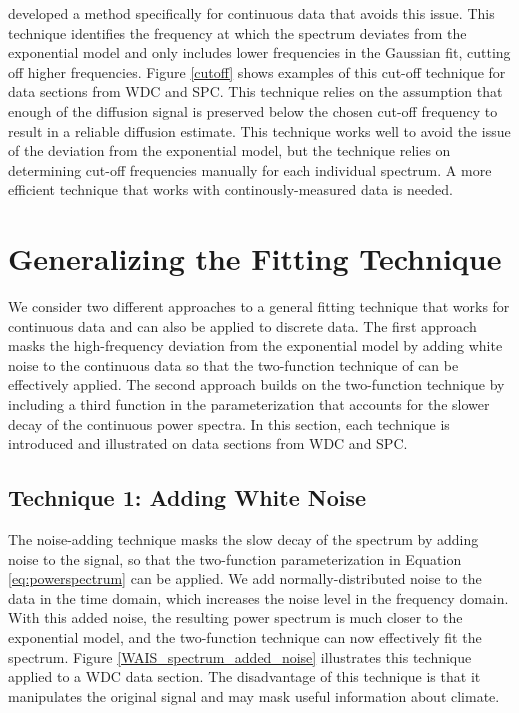 \documentclass[draft, jgrga]{AGUTeX}
\begin{document}
\begin{article}
\citet{Jones2017a} developed a method specifically for continuous data that avoids this issue. This technique identifies the frequency at which the spectrum deviates from the exponential model and only includes lower frequencies in the Gaussian fit, cutting off higher frequencies. Figure \ref{cutoff} shows examples of this cut-off technique for data sections from WDC and SPC. This technique relies on the assumption that enough of the diffusion signal is preserved below the chosen cut-off frequency to result in a reliable diffusion estimate. This technique works well to avoid the issue of the deviation from the exponential model, but the technique relies on determining cut-off frequencies manually for each individual spectrum. A more efficient technique that works with continously-measured data is needed.

\section{Generalizing the Fitting Technique}
We consider two different approaches to a general fitting technique that works for continuous data and can also be applied to discrete data. The first approach masks the high-frequency deviation from the exponential model by adding white noise to the continuous data so that the two-function technique of \citet{Gkinis2014} can be effectively applied. The second approach builds on the two-function technique by including a third function in the parameterization that accounts for the slower decay of the continuous power spectra. In this section, each technique is introduced and illustrated on data sections from WDC and SPC.

\subsection{Technique 1: Adding White Noise}
The noise-adding technique masks the slow decay of the spectrum by adding noise to the signal, so that the two-function parameterization in Equation \ref{eq:powerspectrum} can be applied. We add normally-distributed noise to the data in the time domain, which increases the noise level in the frequency domain. With this added noise, the resulting power spectrum is much closer to the exponential model, and the two-function technique can now effectively fit the spectrum. Figure \ref{WAIS_spectrum_added_noise} illustrates this technique applied to a WDC data section. The disadvantage of this technique is that it manipulates the original signal and may mask useful information about climate.


\end{article}
\end{document}
